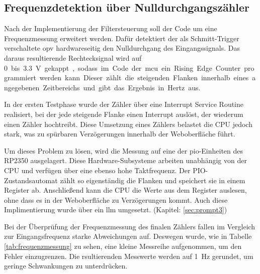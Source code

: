 \documentclass[../main_config.tex]{subfiles}
\begin{document}
\subsection{Frequenzdetektion über Nulldurchgangszähler}

Nach der Implementierung der Filtersteuerung soll der Code um eine Frequenzmessung erweitert werden. Dafür detektiert der als Schmitt-Trigger verschaltete \gls{opv} hardwareseitig den Nulldurchgang des Eingangssignals. Das daraus resultierende Rechtecksignal wird auf \SI{0} bis \SI{3,3}{\volt} gekappt, sodass im Code der \gls{mcu} ein Rising Edge Counter programmiert werden kann. Dieser zählt die steigenden Flanken innerhalb eines angegebenen Zeitbereichs und gibt das Ergebnis in Hertz aus.\par
\medskip

In der ersten Testphase wurde der Zähler über eine Interrupt Service Routine realisiert, bei der jede steigende Flanke einen Interrupt auslöst, der wiederum einen Zähler hochtreibt. Diese Umsetzung eines Zählers belastet die CPU jedoch stark, was zu spürbaren Verzögerungen innerhalb der Weboberfläche führt.\par
\medskip

Um dieses Problem zu lösen, wird die Messung auf eine der \gls{pio}-Einheiten des RP2350 ausgelagert. Diese Hardware-Subsysteme arbeiten  unabhängig von der CPU und verfügen über eine ebenso hohe Taktfrequenz. Der PIO-Zustandsautomat zählt so eigenständig die Flanken und speichert sie in einem Register ab. Anschließend kann die CPU die Werte aus dem Register auslesen, ohne dass es in der Weboberfläche zu Verzögerungen kommt. Auch diese Implimentierung wurde über ein \gls{llm} umgesetzt. (Kapitel: \ref{sec:prompt3}) \par
\medskip

Bei der Überprüfung der Frequenzmessung des finalen Zählers fallen im Vergleich zur Eingangsfrequenz starke Abweichungen auf. Deswegen wurde, wie in Tabelle \ref{tab:frequenzmessung} zu sehen, eine kleine Messreihe aufgenommen, um den Fehler einzugrenzen. Die rsultierenden Messwerte werden auf \SI{1}{\hertz} gerundet, um geringe Schwankungen zu unterdrücken. \par
\medskip
\end{document}
